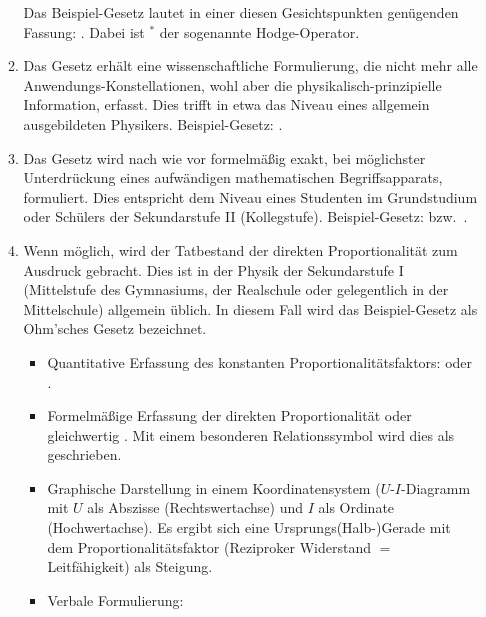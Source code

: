 \begin{enumerate}
\begin{enumerate}
Das Beispiel-Gesetz lautet in einer diesen Gesichtspunkten
gen\"{u}genden Fassung:
. Dabei ist ${^*}$
der sogenannte Hodge-Operator.

\item
Das Gesetz erh\"{a}lt eine wissenschaftliche Formulierung,
die nicht mehr alle An\-wen\-dungs-Kon\-stella\-tio\-nen,
wohl aber die physikalisch-prinzipielle Information, erfasst.
Dies trifft in etwa das Niveau eines allgemein ausgebildeten
Physikers.
Beispiel-Gesetz: .

\item
Das Gesetz wird nach wie vor formelm\"{a}{\ss}ig exakt, bei m\"{o}glichster
Unterdr\"{u}ckung eines aufw\"{a}ndigen mathematischen
Begriffsapparats, formuliert.
Dies entspricht dem Niveau eines Studenten im Grundstudium
oder Sch\"{u}lers der Sekundarstufe II (Kollegstufe).
Beispiel-Gesetz:
 bzw.\
.

\item
Wenn m\"{o}glich, wird der Tatbestand der direkten Proportionalit\"{a}t zum
Ausdruck gebracht.
Dies ist in der Physik der Sekundarstufe I
(Mittelstufe des Gymnasiums, der Realschule oder gelegentlich
in der Mittelschule) allgemein \"{u}blich.
In diesem Fall wird das Beispiel-Gesetz als Ohm'sches
Gesetz bezeichnet.
\begin{itemize}
\item
Quantitative Erfassung des konstanten
Pro\-por\-tio\-na\-li\-t\"{a}ts\-fak\-tors:
 oder .
\item
Formelm\"{a}{\ss}ige Erfassung der direkten Proportionalit\"{a}t
\fbox{$ \frac{U}{I} = \const $ } oder gleichwertig
.
Mit einem besonderen Relationssymbol wird dies als
 geschrieben.
\item
Graphische Darstellung in einem Koordinatensystem
($U$-$I$-Diagramm mit $U$ als Abszisse (Rechtswertachse)
und $I$ als Ordinate (Hochwertachse).
Es ergibt sich eine Ur\-sprungs\-(Halb-)Gerade mit dem
Proportionalit\"{a}tsfaktor
(Reziproker Widerstand $=$ Leitf\"{a}higkeit) als Steigung.
\item
Verbale Formulierung:
\begin{quote}
\end{quote}
\end{itemize}


\end{enumerate}
\end{enumerate}
